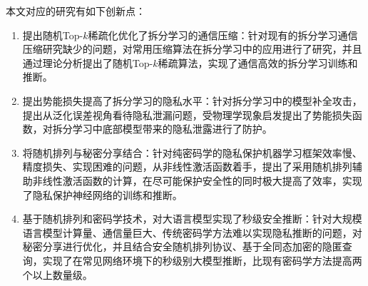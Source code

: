 本文对应的研究有如下创新点：
\begin{enumerate}
    \item 提出随机Top-$k$稀疏化优化了拆分学习的通信压缩：针对现有的拆分学习通信压缩研究缺少的问题，对常用压缩算法在拆分学习中的应用进行了研究，并且通过理论分析提出了随机Top-$k$稀疏算法，实现了通信高效的拆分学习训练和推断。
    \item 提出势能损失提高了拆分学习的隐私水平：针对拆分学习中的模型补全攻击，提出从泛化误差视角看待隐私泄漏问题，受物理学现象启发提出了势能损失函数，对拆分学习中底部模型带来的隐私泄露进行了防护。
    \item 将随机排列与秘密分享结合：针对纯密码学的隐私保护机器学习框架效率慢、精度损失、实现困难的问题，从非线性激活函数着手，提出了采用随机排列辅助非线性激活函数的计算，在尽可能保护安全性的同时极大提高了效率，实现了隐私保护神经网络的训练和推断。
    \item 基于随机排列和密码学技术，对大语言模型实现了秒级安全推断：针对大规模语言模型计算量、通信量巨大、传统密码学方法难以实现隐私推断的问题，对秘密分享进行优化，并且结合安全随机排列协议、基于全同态加密的隐匿查询，实现了在常见网络环境下的秒级别大模型推断，比现有密码学方法提高两个以上数量级。
\end{enumerate}